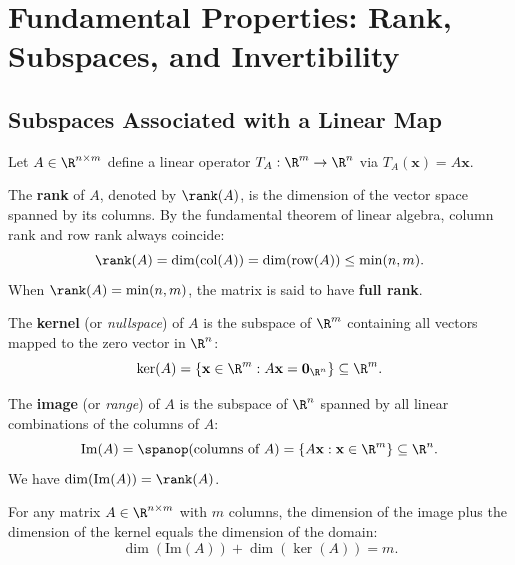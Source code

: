 \FloatBarrier
\section[Fundamental Properties: Rank, Subspaces, and Invertibility]{Fundamental Properties: Rank,\\ Subspaces, and Invertibility}

\subsection{Subspaces Associated with a Linear Map}

Let $A \in \R^{n \times m}$ define a linear operator $T_A: \R^m \to \R^n$ via $T_A(\mathbf{x}) = A\mathbf{x}$.

\begin{definition}
The \textbf{rank} of $A$, denoted by $\rank(A)$, is the dimension of the vector space spanned by its columns. By the fundamental theorem of linear algebra, column rank and row rank always coincide:
\begin{equation}
    \rank(A) = \dim(\mathrm{col}(A)) = \dim(\mathrm{row}(A)) \le \min(n, m).
\end{equation}
When $\rank(A) = \min(n, m)$, the matrix is said to have \textbf{full rank}.
\end{definition}

\begin{definition}
The \textbf{kernel} (or \textit{nullspace}) of $A$ is the subspace of $\R^m$ containing all vectors mapped to the zero vector in $\R^n$:
\begin{equation}
    \ker(A) = \left\{ \mathbf{x} \in \R^m : A\mathbf{x} = \mathbf{0}_{\R^n} \right\} \subseteq \R^m.
\end{equation}
\end{definition}

\begin{definition}
The \textbf{image} (or \textit{range}) of $A$ is the subspace of $\R^n$ spanned by all linear combinations of the columns of $A$:
\begin{equation}
    \mathrm{Im}(A) = \spanop(\text{columns of } A) = \left\{ A\mathbf{x} : \mathbf{x} \in \R^m \right\} \subseteq \R^n.
\end{equation}
We have $\dim(\mathrm{Im}(A)) = \rank(A)$.
\end{definition}

\begin{theorem}
For any matrix $A \in \R^{n \times m}$ with $m$ columns, the dimension of the image plus the dimension of the kernel equals the dimension of the domain:
\begin{equation}
    \dim(\mathrm{Im}(A)) + \dim(\ker(A)) = m.
\end{equation}
\end{theorem}

